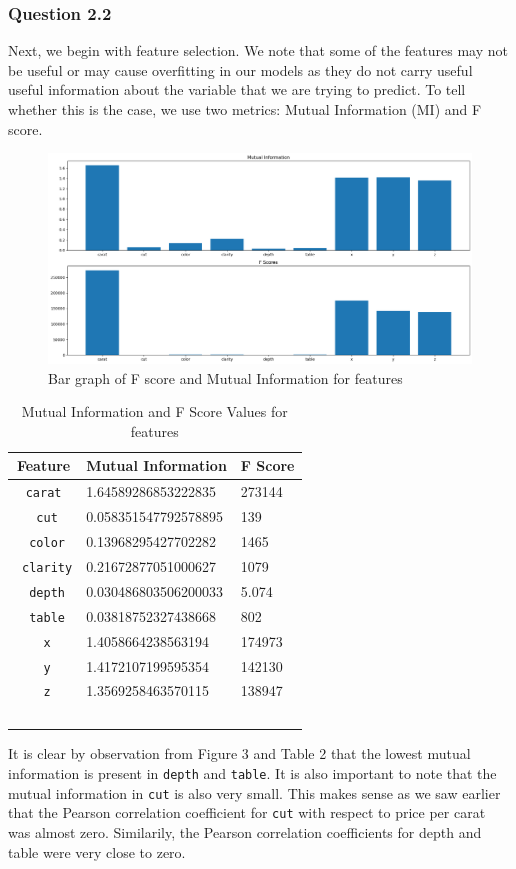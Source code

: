 \documentclass[11pt,letterpaper]{article}
\begin{document}
\subsubsection*{Question 2.2}
Next, we begin with feature selection. We note that some of the features may not
be useful or may cause overfitting in our models as they do not carry useful 
useful information about the variable that we are trying to predict. To tell 
whether this is the case, we use two metrics: Mutual Information (MI) and F 
score.

\begin{figure}[H]
    \centering
   \includegraphics[width=0.8\linewidth]{../Figures/Question2/mi.png}
   \caption{Bar graph of F score and Mutual Information for features}
\end{figure}
\begin{table}[!ht]
    \centering
    \begin{tabular}{c l l}
    \hline
        Feature & Mutual Information & F Score \\ \hline
        \texttt{carat} & 1.64589286853222835 & 273144 \\ \
        \texttt{cut} &0.058351547792578895 & 139 \\ \
        \texttt{color} &0.13968295427702282 & 1465 \\ \
        \texttt{clarity} & 0.21672877051000627 & 1079 \\ \
        \texttt{depth} & 0.030486803506200033 & 5.074 \\ \
        \texttt{table} & 0.03818752327438668 & 802 \\ \
        \texttt{x} & 1.4058664238563194 & 174973 \\ \
       \texttt{y} & 1.4172107199595354 & 142130 \\ \
        \texttt{z} & 1.3569258463570115 & 138947 \\ \
    \end{tabular}
    \caption{Mutual Information and F Score Values for features}
\end{table}
It is clear by observation from Figure 3 and Table 2 that the lowest mutual 
information is present in \texttt{depth} and \texttt{table}. It is also 
important to note that the mutual information in \texttt{cut} is also very small. 
This makes sense as we saw earlier that the Pearson correlation coefficient for 
\texttt{cut} with respect to price per carat was almost zero. Similarily, the 
Pearson correlation coefficients for depth and table were very close to zero. \\ 
\end{document}
